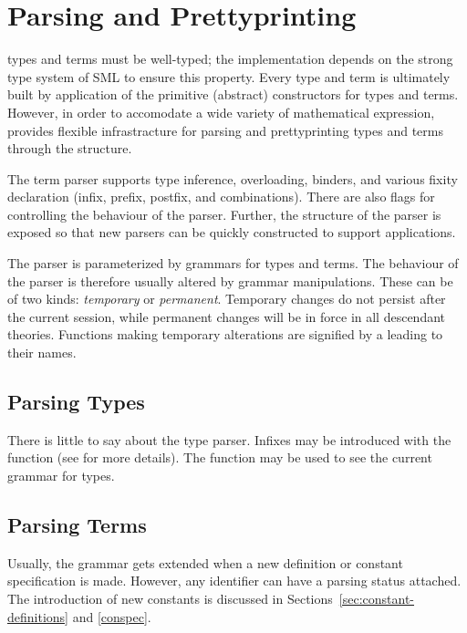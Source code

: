 {\section{Parsing and Prettyprinting}

\HOL{} types and terms must be well-typed; the \HOL{} implementation
depends on the strong type system of SML to ensure this property.
Every type and term is ultimately built by application of the
primitive (abstract) constructors for types and terms. However, in
order to accomodate a wide variety of mathematical expression,
\HOL{} provides flexible infrastracture for parsing and prettyprinting
types and terms through the  structure.

The term parser supports type inference, overloading, binders, and
various fixity declaration (infix, prefix, postfix, and
combinations). There are also flags for controlling the behaviour
of the parser. Further, the structure of the parser is exposed so that
new parsers can be quickly constructed to support applications.

The parser is parameterized by grammars for types and terms. The
behaviour of the parser is therefore usually altered by grammar
manipulations. These can be of two kinds: \emph{temporary} or
\emph{permanent}.  Temporary changes do not persist after the current
session, while permanent changes will be in force in all descendant
theories.  Functions making temporary alterations are signified
by a leading  to their names.

\subsection{Parsing Types}

There is little to say about the type parser. Infixes may be
introduced with the function  (see \REFERENCE{}
for more details).  The function  may be used to
see the current grammar for types.

\subsection{Parsing Terms}

Usually, the \HOL{} grammar gets extended when a new definition or
constant specification is made. However, any identifier can have a
parsing status attached. The introduction of new constants is
discussed in Sections~\ref{sec:constant-definitions} and
\ref{conspec}.


}
